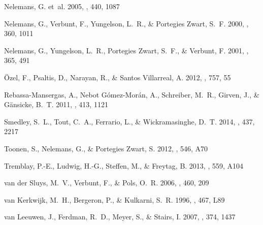 \documentclass[apjl]{emulateapj}
\begin{document}
\begin{thebibliography}{43}
{Nelemans}, G. {et~al.} 2005, \aap, 440, 1087

{Nelemans}, G., {Verbunt}, F., {Yungelson}, L.~R., \& {Portegies Zwart}, S.~F.
  2000, \aap, 360, 1011

{Nelemans}, G., {Yungelson}, L.~R., {Portegies Zwart}, S.~F., \& {Verbunt}, F.
  2001, \aap, 365, 491

{{\"O}zel}, F., {Psaltis}, D., {Narayan}, R., \& {Santos Villarreal}, A. 2012,
  \apj, 757, 55

{Rebassa-Mansergas}, A., {Nebot G{\'o}mez-Mor{\'a}n}, A., {Schreiber}, M.~R.,
  {Girven}, J., \& {G{\"a}nsicke}, B.~T. 2011, \mnras, 413, 1121

{Smedley}, S.~L., {Tout}, C.~A., {Ferrario}, L., \& {Wickramasinghe}, D.~T.
  2014, \mnras, 437, 2217

{Toonen}, S., {Nelemans}, G., \& {Portegies Zwart}, S. 2012, \aap, 546, A70

{Tremblay}, P.-E., {Ludwig}, H.-G., {Steffen}, M., \& {Freytag}, B. 2013, \aap,
  559, A104

{van der Sluys}, M.~V., {Verbunt}, F., \& {Pols}, O.~R. 2006, \aap, 460, 209

{van Kerkwijk}, M.~H., {Bergeron}, P., \& {Kulkarni}, S.~R. 1996, \apjl, 467,
  L89

{van Leeuwen}, J., {Ferdman}, R.~D., {Meyer}, S., \& {Stairs}, I. 2007, \mnras,
  374, 1437


\end{thebibliography}
\end{document}
